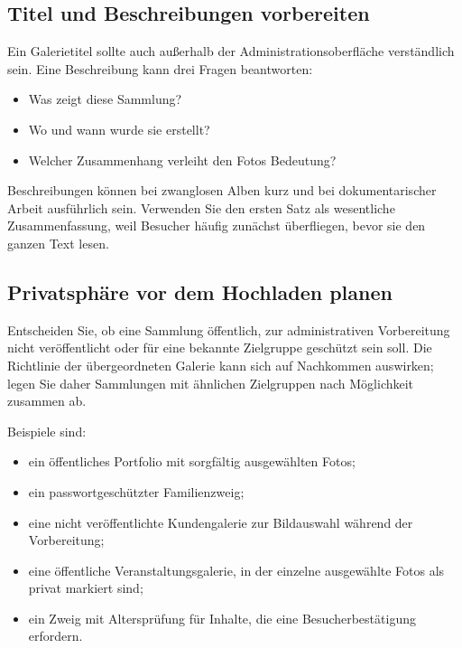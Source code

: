 \documentclass[11pt,a4paper]{article}
\begin{document}
\subsection{Titel und Beschreibungen vorbereiten}

Ein Galerietitel sollte auch außerhalb der Administrationsoberfläche
verständlich sein. Eine Beschreibung kann drei Fragen beantworten:

\begin{itemize}
  \item Was zeigt diese Sammlung?
  \item Wo und wann wurde sie erstellt?
  \item Welcher Zusammenhang verleiht den Fotos Bedeutung?
\end{itemize}

Beschreibungen können bei zwanglosen Alben kurz und bei dokumentarischer Arbeit
ausführlich sein. Verwenden Sie den ersten Satz als wesentliche Zusammenfassung,
weil Besucher häufig zunächst überfliegen, bevor sie den ganzen Text lesen.

\subsection{Privatsphäre vor dem Hochladen planen}

Entscheiden Sie, ob eine Sammlung öffentlich, zur administrativen Vorbereitung
nicht veröffentlicht oder für eine bekannte Zielgruppe geschützt sein soll. Die
Richtlinie der übergeordneten Galerie kann sich auf Nachkommen auswirken; legen
Sie daher Sammlungen mit ähnlichen Zielgruppen nach Möglichkeit zusammen ab.

Beispiele sind:

\begin{itemize}
  \item ein öffentliches Portfolio mit sorgfältig ausgewählten Fotos;
  \item ein passwortgeschützter Familienzweig;
  \item eine nicht veröffentlichte Kundengalerie zur Bildauswahl während der
  Vorbereitung;
  \item eine öffentliche Veranstaltungsgalerie, in der einzelne ausgewählte
  Fotos als privat markiert sind;
  \item ein Zweig mit Altersprüfung für Inhalte, die eine Besucherbestätigung
  erfordern.
\end{itemize}
\end{document}
